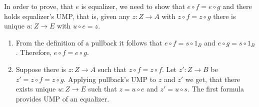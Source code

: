 \documentclass[12pt]{article}
\theoremstyle{definition}
\begin{document}
\begin{enumerate}
\begin{figure}[h!]
    \end{figure}

    In order to prove, that $e$ is equalizer, we need to show that $e \circ f = e \circ g$ and there holds equalizer's UMP, that is, given any $z : Z \to A$ with $z \circ f = z \circ g$ there is unique $u : Z \to E$ with $u \circ e = z$.

    \begin{enumerate}
      \item From the definition of a pullback it follows that $e \circ f = s \circ 1_B$ and $e \circ g = s \circ 1_B$. Therefore, $e \circ f = e \circ g$.

      \item Suppose there is $z : Z \to A$ such that $z \circ f = z \circ f$. Let $z' : Z \to B$ be $z' = z \circ f = z \circ g$. Applying pullback's UMP to $z$ and $z'$ we get, that there exists unique $u : Z \to E$ such that $z = u \circ e$ and $z' = u \circ s$. The first formula provides UMP of an equalizer.
    \end{enumerate}

\end{enumerate}
\end{document}
